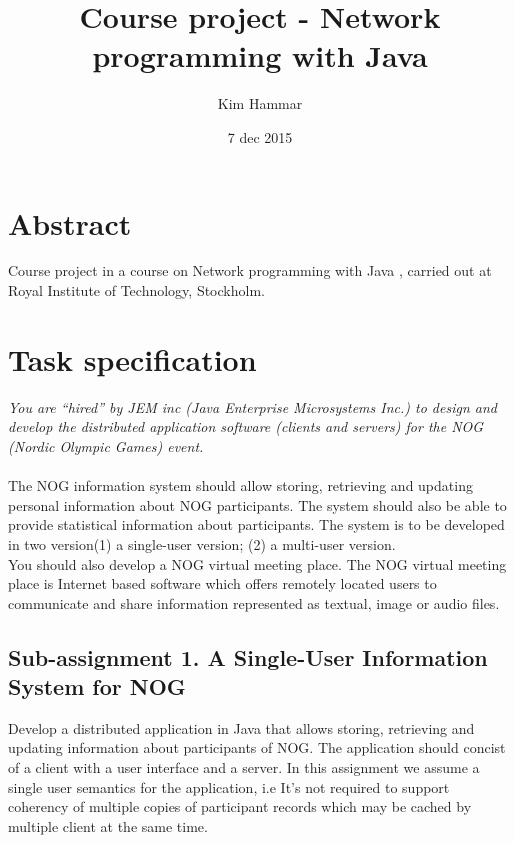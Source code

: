 \documentclass[a4paper, 11pt]{article}
\title{Course project - Network programming with Java}
\author{Kim Hammar}
\date{7 dec 2015}
\begin{document}
\maketitle
\thispagestyle{empty}
\begin{versionhistory}
\end{versionhistory}
\newpage
\tableofcontents
\newpage

\section{Abstract}
Course project in a course on Network programming with Java \citep{kth_1}, carried out at Royal Institute of Technology, Stockholm.
\newpage
\section{Task specification}
\textit{You are ``hired'' by JEM inc (Java Enterprise Microsystems Inc.) to design and develop the distributed application software (clients and servers) for the NOG (Nordic Olympic Games) event.} \\ \\
The NOG information system should allow storing, retrieving and updating personal information about NOG participants. The system should also be able to provide statistical information about participants. The system is to be developed in two version(1) a single-user version; (2) a multi-user version. \\ 
You should also develop a NOG virtual meeting place. The NOG virtual meeting place is Internet based software which offers remotely located users to communicate and share information represented as textual, image or audio files. 
\subsection{Sub-assignment 1. A Single-User Information System for NOG}
Develop a distributed application in Java that allows storing, retrieving and updating information about participants of NOG. The application should concist of a client with a user interface and a server. In this assignment we assume a single user semantics for the application, i.e It's not required to support coherency of multiple copies of participant records which may be cached by multiple client at the same time.
\end{document}
